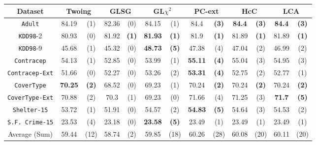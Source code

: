 \begin{table}
\small
\centering
\begin{tabular}{c|cc|cc|cc|cc|cc|cc} 
Dataset            &\multicolumn{2}{c|}{Twoing} & \multicolumn{2}{c|}{GLSG} & \multicolumn{2}{c|}{GL$\chi^2$} & \multicolumn{2}{c|}{PC-ext}& \multicolumn{2}{c|}{HcC} & \multicolumn{2}{c}{LCA} \\
\hline   
{\tt Adult}        & 84.19          & (1)       & 82.36      & (0)          &  84.15      &  (1)              & 84.4        & {\bf (3)}    & {\bf 84.4 } & {\bf (3)} & {\bf 84.4 } & {\bf (3)} \\
{\tt KDD98}-2      & 80.93          & (0)       & 81.92      & {\bf (1)}    & {\bf 81.93} &  {\bf (1)}        & 81.9        & {\bf (1)}    & 81.89       & {\bf (1)} & 81.89       & {\bf (1)} \\ 
{\tt KDD98}-9      & 45.68          & (1)       & 45.32      & (0)          & {\bf 48.73} & {\bf (5)}         &  47.38      & (4)          & 47.04       & (2)       & 46.99       & (2)       \\ 
{\tt Contracep}    & 54.13          & (1)       & 52.85      & (0)          & 53.99       & (1)               & {\bf 55.11} & {\bf (4)}    & 55.04       & (3)       & 54.95       & (3)       \\  
{\tt Contracep-Ext}& 51.66          & (0)       & 52.27      & (0)          & 53.26       & (2)               & {\bf 53.31} & {\bf (4)}    & 52.75       & (2)       & 52.77       & (1)       \\
{\tt CoverType}    & {\bf 70.25}    & {\bf (2)} & 68.52      & (0)          & 69.23       & (1)               &  70.24      & {\bf (2)}    & 70.24       & {\bf (2)} & 70.24       & {\bf (2)} \\  
{\tt CoverType-Ext}& 70.88          & (2)       & 70.3       & (1)          & 69.23       & (0)               & 71.66       & (4)          & 71.25       & (3)       & {\bf 71.7 } & {\bf (5)} \\ 
{\tt Shelter-15}   & 53.72          & (1)       & 51.91      & (0)          & 54.57       & (2)               & {\bf 54.83} & {\bf (5)}    & 54.64       & (3)       & 54.53       & (2)       \\   
{\tt S.F. Crime-15}& 23.53          & (4)       & 23.18      & (0)          & {\bf 23.58} & {\bf (5)}         & 23.49       & (1)          & 23.49       & (1)       & 23.49       & (1)       \\ 
\hline
Average (Sum)      & 59.44          & (12)      & 58.74      & (2)          & 59.85       & (18)              & 60.26       & (28)         & 60.08       & (20)      & 60.11       & (20)


\end{tabular}
\end{table}
